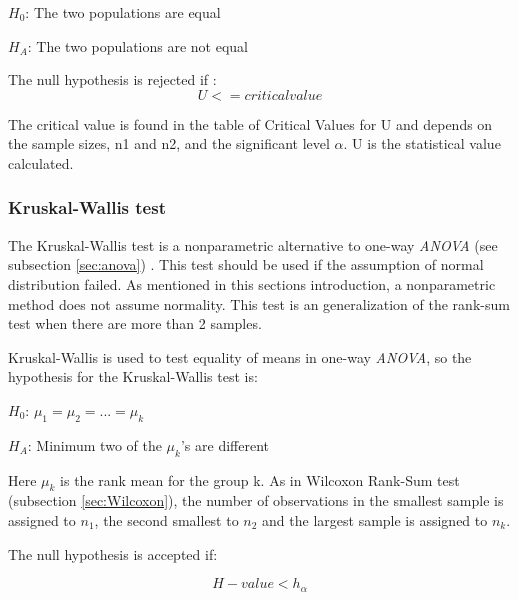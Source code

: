 \centerline{$H_{0}$: The two populations are equal} 
\centerline{$H_{A}$: The two populations are not equal}

The null hypothesis is rejected if \citep{LaMorte2017}: \\

\begin{equation}
\label{eq:mannwhitey-ciritcalvalue}
U <= critical value
\end{equation}

The critical value is found in the table of Critical Values for U and depends on the sample sizes, n1 and n2, and the significant level $\alpha$. U is the statistical value calculated. 

\subsubsection[Kruskal]{Kruskal-Wallis test}\label{sec:kruskal-w-test}
The Kruskal-Wallis test is a nonparametric alternative to one-way \textit{ANOVA} (see subsection \ref{sec:anova})  \citep{Walpole2012}. This test should be used if the assumption of normal distribution failed. As mentioned in this sections introduction, a nonparametric method does not assume normality. This test is an generalization of the rank-sum test when there are more than 2 samples.

Kruskal-Wallis is used to test equality of means in one-way \textit{ANOVA}, so the hypothesis for the Kruskal-Wallis test is:\newline

\centerline{$H_{0}$:  $\mu_{1} =  \mu_{2} = ... = \mu_{k} $} 
\centerline{$H_{A}$: Minimum two of the $\mu_{k}$'s are different}

Here $\mu_{k}$ is the rank mean for the group k. As in Wilcoxon Rank-Sum test (subsection \ref{sec:Wilcoxon}), the number of observations in the smallest sample is assigned to $n_1$, the second smallest to $n_2$ and the largest sample is assigned to $n_k$. 

The null hypothesis is accepted if: 

\begin{equation}
\label{eq:kruskapw-accept}
H-value < h_{\alpha}
\end{equation}